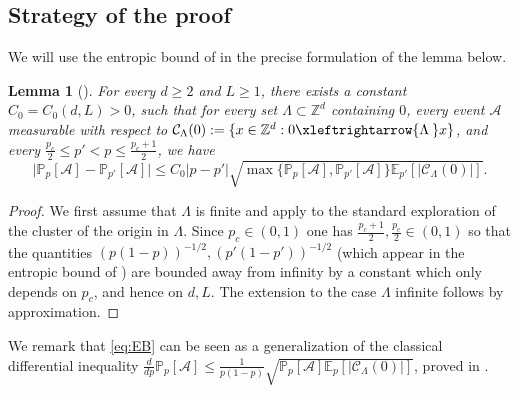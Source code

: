 \documentclass[11pt,a4paper]{article}
\numberwithin{equation}{section}
\theoremstyle{plain}
\newtheorem{Lem}[Thm]{Lemma}
\theoremstyle{definition}
\newcommand{\connect}{\xleftrightarrow}
\newcommand{\1}{\mathbf 1}
\begin{document}
\subsection{Strategy of the proof}\label{sec:introStrat}	
	
We will use the entropic bound of \cite{DewanMuirhead} in the precise formulation of the lemma below. 
\begin{Lem}[{\hspace{1pt}\cite[Proposition~1.21]{DewanMuirhead}}]\label{l.EB} For every $d\geq 2$ and $L\geq 1$, there exists a constant $C_0=C_0(d,L)>0$, such that for every set $\Lambda\subset \mathbb Z^d$ containing $0$, every event $\mathcal{A}$ measurable with respect to $\mathcal C_{\Lambda}(0):=\{x\in \mathbb Z^d:0\connect{\Lambda\:}x\}$, and every $\tfrac{p_c}{2}\leq p'< p\leq \tfrac{p_c+1}{2}$, we have
\begin{equation}\label{eq:EB}
\big|\mathbb{P}_{p}[\mathcal{A}] - \mathbb{P}_{p'}[\mathcal{A}]\big| \leq C_0 |p-p'| \sqrt{\max\{\mathbb{P}_{p}[\mathcal{A}], \mathbb{P}_{p'}[\mathcal{A}]\}
\mathbb{E}_{p'}[|\mathcal C_{\Lambda}(0)|]}.
\end{equation}
\end{Lem}
\begin{proof} We first assume that $\Lambda$ is finite and apply \cite[Proposition~1.21]{DewanMuirhead} to the standard exploration of the cluster of the origin in $\Lambda$. Since $p_c\in (0,1)$ one has $\tfrac{p_c+1}{2},\tfrac{p_c}{2}\in (0,1)$ so that the quantities $(p(1-p))^{-1/2}, (p'(1-p'))^{-1/2}$ (which appear in the entropic bound of \cite{DewanMuirhead}) are bounded away from infinity by a constant which only depends on $p_c$, and hence on $d,L$. The extension to the case $\Lambda$ infinite follows by approximation.
\end{proof}

We remark that \eqref{eq:EB} can be seen as a generalization of the classical differential inequality $\frac{d}{dp} \mathbb{P}_{p}[\mathcal{A}] \leq \frac{1}{p(1-p)} \sqrt{ \mathbb{P}_{p}[\mathcal{A}] \mathbb{E}_{p}[|\mathcal C_{\Lambda}(0)|]}$, proved in \cite{OS2007learning}.
\end{document}
